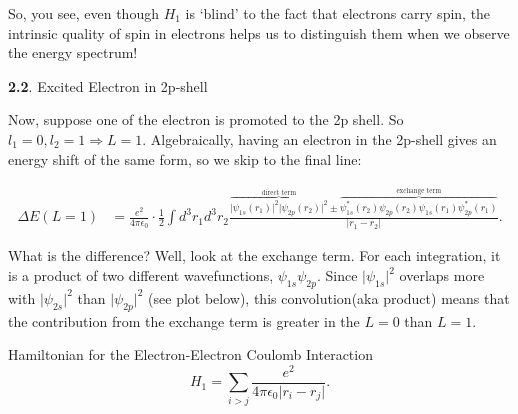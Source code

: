 \documentclass{article}
\numberwithin{equation}{section} %
\begin{document}
So, you see, even though $H_1$ is `blind' to the fact that electrons carry spin, the intrinsic quality of spin in electrons helps us to distinguish them when we observe the energy spectrum!

\noindent\textbf{2.2}. Excited Electron in 2p-shell

Now, suppose one of the electron is promoted to the 2p shell. So $l_1=0, l_2=1 \Rightarrow L=1$. Algebraically, having an electron in the 2p-shell gives an energy shift of the same form, so we skip to the final line:

\begin{equation}
\begin{split}
\Delta E(L=1) &=\frac{e^2}{4\pi\epsilon_0}\cdot \frac{1}{2}\int d^3r_1d^3r_2 
\frac{\overbrace{\vert\psi_{1s}(r_1)\vert^2\vert\psi_{2p}(r_2)\vert^2}^{\text{direct term}} \pm \overbrace{\psi_{1s}^*(r_2)\psi_{2p}(r_2)\psi_{1s}(r_1)\psi^*_{2p}(r_1)}^{\text{exchange term}}}{\vert r_1-r_2\vert}.
\end{split}
\end{equation}

What is the difference? Well, look at the exchange term. For each integration, it is a product of two different wavefunctions, $\psi_{1s}\psi_{2p}$. Since $\vert\psi_{1s}\vert^2$ overlaps more with $\vert\psi_{2s}\vert^2$ than $\vert\psi_{2p}\vert^2$ (see plot below), this convolution(aka product) means that the contribution from the exchange term is greater in the $L=0$ than $L=1$. 




\begin{tcolorbox}[colback=pink]
Hamiltonian for the Electron-Electron Coulomb Interaction
\begin{equation}
H_1=\sum_{i>j} \frac{e^2}{4\pi\epsilon_0\vert r_i-r_j\vert}.
\end{equation}
\end{tcolorbox}



\newpage

\end{document}
